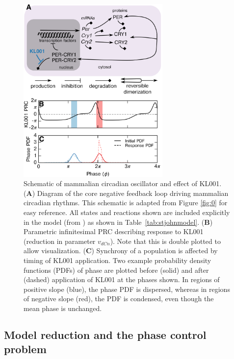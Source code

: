 \begin{figure}[p]
    \begin{center}
\includegraphics[width=7.5cm]{chap7/figures/fig1_diagram.png}
\end{center}
\caption{Schematic of mammalian circadian oscillator and effect of KL001. (\textbf{A}) Diagram of the core negative feedback loop driving mammalian circadian rhythms. This schematic is adapted from Figure \ref{fig:0} for easy reference. All states and reactions shown are included explicitly in the model (from \cite{StJohn2014a}) as shown in Table~\ref{tab:stjohnmodel}.
(\textbf{B}) Parametric infinitesimal PRC describing response to KL001 (reduction in parameter $v_{dCn}$). Note that this is double plotted to allow visualization.
(\textbf{C}) Synchrony of a population is affected by timing of KL001 application. Two example probability density functions (PDFs) of phase are plotted before (solid) and after (dashed) application of KL001 at the phases shown. In regions of positive slope (blue), the phase PDF is dispersed, whereas in regions of negative slope (red), the PDF is condensed, even though the mean phase is unchanged.}
\label{fig:fig1}
\end{figure}

\subsection*{Model reduction and the phase control problem}

